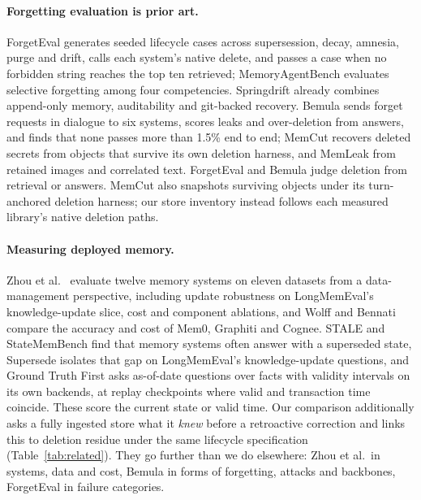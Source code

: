 \documentclass[conference]{IEEEtran}
\begin{document}
\paragraph{Forgetting evaluation is prior art.}
ForgetEval \citep{forgetevalpaper,forgeteval} generates seeded lifecycle cases
across supersession, decay, amnesia, purge and drift, calls each system's native
delete, and passes a case when no forbidden string reaches the top ten
retrieved; MemoryAgentBench \citep{memoryagentbench} evaluates selective
forgetting among four competencies. Springdrift \citep{springdrift} already
combines append-only memory, auditability and git-backed recovery. Bemula
\citep{bemula} sends forget requests in dialogue to six systems, scores leaks and
over-deletion from answers, and finds that none passes more than 1.5\% end to
end; MemCut \citep{memcut} recovers deleted secrets from objects that survive
its own deletion harness, and MemLeak \citep{memleak} from retained images and
correlated text. ForgetEval and Bemula judge deletion from retrieval or
answers. MemCut also snapshots surviving objects under its turn-anchored
deletion harness; our store inventory instead follows each measured library's
native deletion paths.

\paragraph{Measuring deployed memory.}
Zhou et al.\ \citep{agentnative} evaluate twelve memory systems on eleven
datasets from a data-management perspective, including update robustness on
LongMemEval's knowledge-update slice, cost and component ablations, and Wolff
and Bennati \citep{wolffcost} compare the accuracy and cost of Mem0, Graphiti and
Cognee. STALE \citep{stale} and StateMemBench \citep{statemembench} find that
memory systems often answer with a superseded state, Supersede \citep{supersede}
isolates that gap on LongMemEval's knowledge-update questions, and Ground Truth
First \citep{groundtruthfirst} asks as-of-date questions over facts with
validity intervals on its own backends, at replay checkpoints where valid and
transaction time coincide. These score the current state or valid time. Our comparison additionally
asks a fully ingested store what it \emph{knew} before a retroactive correction
and links this to deletion residue under the same lifecycle specification
(Table~\ref{tab:related}). They go further than we do elsewhere: Zhou et al.\ in
systems, data and cost, Bemula in forms of forgetting, attacks and backbones,
ForgetEval in failure categories.
\end{document}
